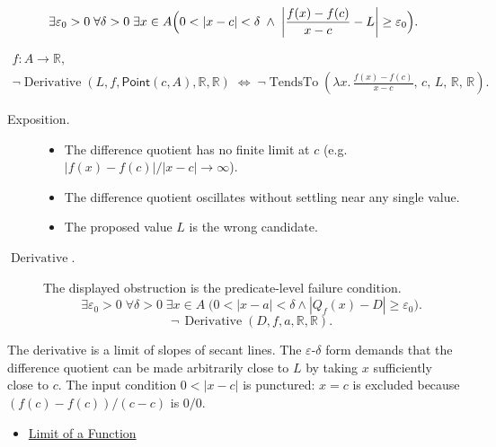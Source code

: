 \begin{remark*}
\[
\exists \varepsilon_0 > 0\;\forall \delta > 0\;\exists x \in A
\Bigl(0 < |x-c| < \delta \;\land\; \left|\frac{f(x)-f(c)}{x-c} - L\right| \ge \varepsilon_0\Bigr).
\]
\end{remark*}

\begin{remark*}
\[
\begin{aligned}
  f\colon A\to\mathbb{R},\\
\neg\operatorname{Derivative}(L,f,\mathsf{Point}(c,A),\mathbb R,\mathbb R)
\;\Longleftrightarrow\;
\neg\operatorname{TendsTo}\!\left(\lambda x.\,\frac{f(x)-f(c)}{x-c},\,c,\,L,\,\mathbb R,\,\mathbb R\right).
\end{aligned}
\]
\end{remark*}

\begin{remark*}
\begin{description}
  \item[Exposition.]
\begin{itemize}
  \item The difference quotient has no finite limit at $c$ (e.g.\ $|f(x)-f(c)|/|x-c| \to \infty$).
  \item The difference quotient oscillates without settling near any single value.
  \item The proposed value $L$ is the wrong candidate.
\end{itemize}


  \item[\(\operatorname{Derivative}.\)]
  The displayed obstruction is the predicate-level failure condition.
  \[
  \exists\varepsilon_0>0\;\forall\delta>0\;\exists x\in A\;\bigl(0<|x-a|<\delta\land |Q_f(x)-D|\ge\varepsilon_0\bigr).
  \]
  \[
  \neg\,\operatorname{Derivative}(D,f,a,\mathbb{R},\mathbb{R}).
  \]
\end{description}
\end{remark*}

\begin{remark*}[Interpretation]
The derivative is a limit of slopes of secant lines. The $\varepsilon$-$\delta$ form demands that the difference quotient can be made arbitrarily close to $L$ by taking $x$ sufficiently close to $c$. The input condition $0 < |x-c|$ is punctured: $x = c$ is excluded because $(f(c)-f(c))/(c-c)$ is $0/0$.
\end{remark*}

\begin{dependencies}
\begin{itemize}
  \item \hyperref[def:limit-function]{Limit of a Function}
\end{itemize}
\end{dependencies}

